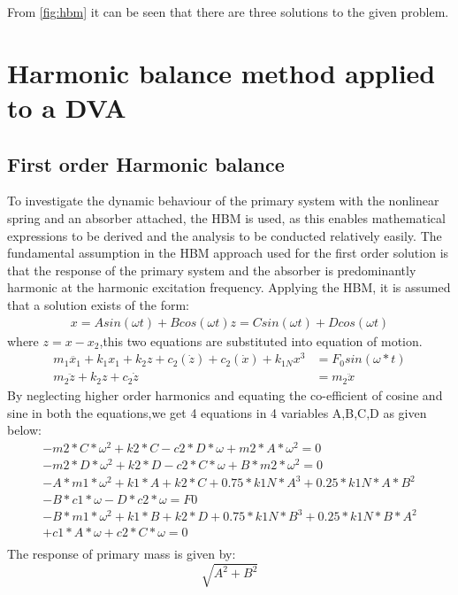 From \ref{fig:hbm} it can be seen that there are three solutions to the given problem.

\section{Harmonic balance method applied to a DVA}
\subsection{First order Harmonic balance}
To investigate the dynamic behaviour of the primary system with the nonlinear spring and an absorber attached, the HBM is used, as this enables mathematical expressions to be derived and the analysis to be conducted relatively easily. The fundamental assumption in the HBM approach used for the first order solution is that the response of the primary system and the absorber is predominantly harmonic at the harmonic excitation frequency. Applying the HBM, it is assumed that a solution exists of the form:
\begin{align*}
x=Asin(\omega t)+Bcos(\omega t)
z=Csin(\omega t)+Dcos(\omega t)
\end{align*}
where $z=x-x_2$,this two equations are substituted into equation of motion.
\begin{align*}
m_1\ddot{x_1}+k_1x_1+k_2z+c_2(\dot{z})+c_2(\dot{x})+k_{1N}x^3&=F_0sin(\omega *t) \\
m_2\ddot{z}+k_2z+c_{2}\dot{z}&=m_2\ddot{x}
\end{align*}
By neglecting higher order harmonics and equating the co-efficient of cosine and sine in both the equations,we get 4  equations in 4 variables A,B,C,D as given below:
\begin{align*}
-m2*C*\omega^2 + k2*C - c2*D*\omega + m2*A*\omega^2 = 0\\
-m2*D*\omega^2 + k2*D - c2*C*\omega + B*m2*\omega^2 = 0\\
-A*m1*\omega^2 + k1*A + k2*C + 0.75*k1N*A^3 + 0.25*k1N*A*B^2 \\- B*c1*\omega - D*c2*\omega = F0\\
-B*m1*\omega^2 + k1*B + k2*D + 0.75*k1N*B^3 + 0.25*k1N*B*A^2 \\ + c1*A*\omega + c2*C*\omega = 0\\
\end{align*}
The response of primary mass is given by:$$\sqrt{A^2+B^2}$$

